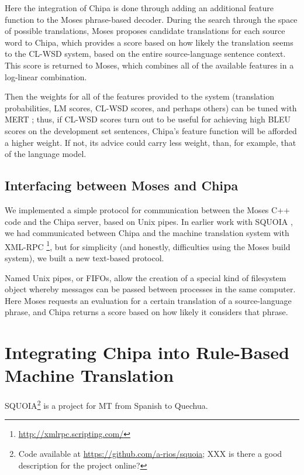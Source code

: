Here the integration of Chipa is done through adding an additional feature
function to the Moses phrase-based decoder. During the search through the space
of possible translations, Moses proposes candidate translations for each source
word to Chipa, which provides a score based on how likely the translation seems
to the CL-WSD system, based on the entire source-language sentence context.
This score is returned to Moses, which combines all of the available features
in a log-linear combination.

Then the weights for all of the features provided to the system (translation
probabilities, LM scores, CL-WSD scores, and perhaps others) can be tuned with
MERT \cite{och:2003:ACL}; thus, if CL-WSD scores turn out to be useful for
achieving high BLEU scores on the development set sentences, Chipa's feature
function will be afforded a higher weight. If not, its advice could carry less
weight, than, for example, that of the language model.


\subsection{Interfacing between Moses and Chipa}
We implemented a simple protocol for communication between the Moses C++ code
and the Chipa server, based on Unix pipes. In earlier work with SQUOIA
\cite{rudnick:saltmil2014}, we had communicated between Chipa and the machine
translation system with XML-RPC \footnote{\url{http://xmlrpc.scripting.com/}},
but for simplicity (and honestly, difficulties using the Moses build system),
we built a new text-based protocol.

Named Unix pipes, or FIFOs, allow the creation of a special kind of filesystem
object whereby messages can be passed between processes in the same computer.
Here Moses requests an evaluation for a certain translation of a
source-language phrase, and Chipa returns a score based on how likely it
considers that phrase.

\section{Integrating Chipa into Rule-Based Machine Translation}
SQUOIA\footnote{Code available at \url{https://github.com/a-rios/squoia};
XXX is there a good description for the project online?}
is a project for MT from Spanish to Quechua.

